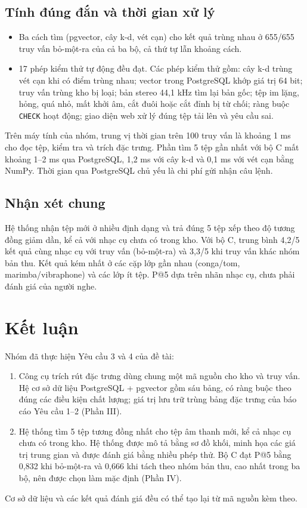 \documentclass[11pt,a4paper]{article}
\begin{document}
\subsection{Tính đúng đắn và thời gian xử lý}\label{sec:dungdan}
\begin{itemize}
\item Ba cách tìm (pgvector, cây k-d, vét cạn) cho kết quả trùng nhau ở 655/655 truy vấn bỏ-một-ra của cả ba bộ, cả thứ tự lẫn khoảng cách.
\item 17 phép kiểm thử tự động đều đạt. Các phép kiểm thử gồm: cây k-d trùng vét cạn khi có điểm trùng nhau; vector trong PostgreSQL khớp giá trị 64 bit; truy vấn trùng kho bị loại; bản stereo 44,1 kHz tìm lại bản gốc; tệp im lặng, hỏng, quá nhỏ, mất khởi âm, cắt đuôi hoặc cắt đỉnh bị từ chối; ràng buộc \texttt{CHECK} hoạt động; giao diện web xử lý đúng tệp tải lên và yêu cầu sai.
\end{itemize}
Trên máy tính của nhóm, trung vị thời gian trên 100 truy vấn là khoảng 1 ms cho đọc tệp, kiểm tra và trích đặc trưng. Phần tìm 5 tệp gần nhất với bộ C mất khoảng 1--2 ms qua PostgreSQL, 1,2 ms với cây k-d và 0,1 ms với vét cạn bằng NumPy. Thời gian qua PostgreSQL chủ yếu là chi phí gửi nhận câu lệnh.

\subsection{Nhận xét chung}
\enlargethispage{2\baselineskip}
Hệ thống nhận tệp mới ở nhiều định dạng và trả đúng 5 tệp xếp theo độ tương đồng giảm dần, kể cả với nhạc cụ chưa có trong kho. Với bộ C, trung bình 4,2/5 kết quả cùng nhạc cụ với truy vấn (bỏ-một-ra) và 3,3/5 khi truy vấn khác nhóm bản thu. Kết quả kém nhất ở các cặp lớp gần nhau (conga/tom, marimba/vibraphone) và các lớp ít tệp. P@5 dựa trên nhãn nhạc cụ, chưa phải đánh giá của người nghe.
\clearpage

\section*{Kết luận}
Nhóm đã thực hiện Yêu cầu 3 và 4 của đề tài:
\begin{enumerate}
\item Công cụ trích rút đặc trưng dùng chung một mã nguồn cho kho và truy vấn. Hệ cơ sở dữ liệu PostgreSQL + pgvector gồm sáu bảng, có ràng buộc theo đúng các điều kiện chất lượng; giá trị lưu trữ trùng bảng đặc trưng của báo cáo Yêu cầu 1--2 (Phần III).
\item Hệ thống tìm 5 tệp tương đồng nhất cho tệp âm thanh mới, kể cả nhạc cụ chưa có trong kho. Hệ thống được mô tả bằng sơ đồ khối, minh họa các giá trị trung gian và được đánh giá bằng nhiều phép thử. Bộ C đạt P@5 bằng 0,832 khi bỏ-một-ra và 0,666 khi tách theo nhóm bản thu, cao nhất trong ba bộ, nên được chọn làm mặc định (Phần IV).
\end{enumerate}
Cơ sở dữ liệu và các kết quả đánh giá đều có thể tạo lại từ mã nguồn kèm theo.
\clearpage
\end{document}
